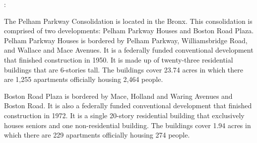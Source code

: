 :  

The Pelham Parkway Consolidation is located in the Bronx. This consolidation is comprised of two developments: Pelham Parkway Houses and Boston Road Plaza. Pelham Parkway Houses is bordered by Pelham Parkway, Williamsbridge Road, and Wallace and Mace Avenues. It is a federally funded conventional development that finished construction in 1950. It is made up of twenty-three residential buildings that are 6-stories tall. The buildings cover 23.74 acres in which there are 1,255 apartments officially housing 2,464 people.   

  

Boston Road Plaza is bordered by Mace, Holland and Waring Avenues and Boston Road. It is also a federally funded conventional development that finished construction in 1972. It is a single 20-story residential building that exclusively houses seniors and one non-residential building. The buildings cover 1.94 acres in which there are 229 apartments officially housing 274 people.   

 
